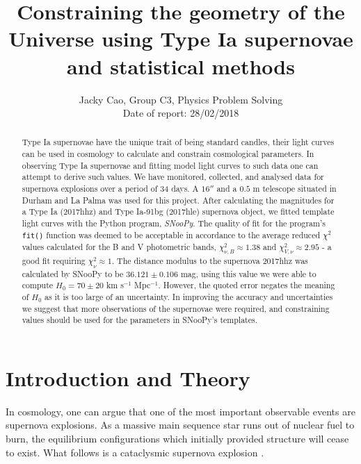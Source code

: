 \documentclass[twocolumn]{revtex4}
\begin{document}
\textheight=26.385cm

\title{Constraining the geometry of the Universe using Type Ia supernovae and statistical methods}
 
\author{Jacky Cao, Group C3, Physics Problem Solving \\ Date of report: 28/02/2018}

\begin{abstract}              
Type Ia supernovae have the unique trait of being standard candles, their light curves can be used in cosmology to calculate and constrain cosmological parameters. In observing Type Ia supernovae and fitting model light curves to such data one can attempt to derive such values. We have monitored, collected, and analysed data for supernova explosions over a period of 34 days. A $16''$ and a $0.5$ m telescope situated in Durham and La Palma was used for this project. After calculating the magnitudes for a Type Ia (2017hhz) and Type Ia-91bg (2017hle) supernova object, we fitted template light curves with the Python program, \textit{SNooPy}. The quality of fit for the program's \texttt{fit()} function was deemed to be acceptable in accordance to the average reduced $\chi^2$ values calculated for the B and V photometric bands, $\chi^2_{\nu,B} \approx 1.38$ and $\chi^2_{V,\nu} \approx 2.95$ - a good fit requiring $\chi^2_{\nu} \approx1$. The distance modulus to the supernova 2017hhz was calculated by SNooPy to be $36.121\pm0.106$ mag, using this value we were able to compute $H_0=70\pm20$ km s$^{-1}$ Mpc$^{-1}$. However, the quoted error negates the meaning of $H_0$ as it is too large of an uncertainty. In improving the accuracy and uncertainties we suggest that more observations of the supernovae were required, and constraining values should be used for the parameters in SNooPy's templates.
\end{abstract}

\maketitle

\vspace{-3ex}
\section{Introduction and Theory} 
\vspace{-2ex}
In cosmology, one can argue that one of the most important observable events are supernova explosions. As a massive main sequence star runs out of nuclear fuel to burn, the equilibrium configurations which initially provided structure will cease to exist. What follows is a cataclysmic supernova explosion \cite{longair}. 
\end{document}
